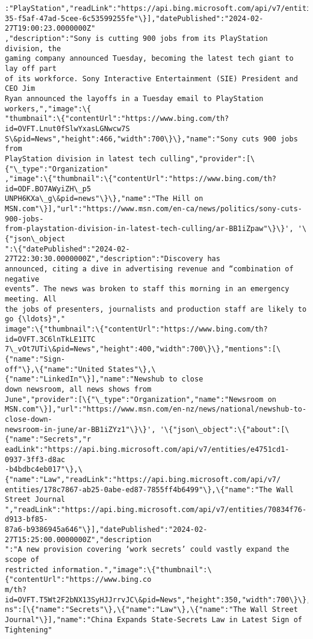\documentclass[11pt]{article}
\begin{document}
\begin{Verbatim}[commandchars=\\\{\}]
:"PlayStation","readLink":"https://api.bing.microsoft.com/api/v7/entities/2b485a
35-f5af-47ad-5cee-6c53599255fe"\}],"datePublished":"2024-02-27T19:00:23.0000000Z"
,"description":"Sony is cutting 900 jobs from its PlayStation division, the
gaming company announced Tuesday, becoming the latest tech giant to lay off part
of its workforce. Sony Interactive Entertainment (SIE) President and CEO Jim
Ryan announced the layoffs in a Tuesday email to PlayStation workers,","image":\{
"thumbnail":\{"contentUrl":"https://www.bing.com/th?id=OVFT.Lnut0fSlwYxasLGNwcw7S
S\&pid=News","height":466,"width":700\}\},"name":"Sony cuts 900 jobs from
PlayStation division in latest tech culling","provider":[\{"\_type":"Organization"
,"image":\{"thumbnail":\{"contentUrl":"https://www.bing.com/th?id=ODF.BO7AWyiZH\_p5
UNPH6KXa\_g\&pid=news"\}\},"name":"The Hill on
MSN.com"\}],"url":"https://www.msn.com/en-ca/news/politics/sony-cuts-900-jobs-
from-playstation-division-in-latest-tech-culling/ar-BB1iZpaw"\}\}', '\{"json\_object
":\{"datePublished":"2024-02-27T22:30:30.0000000Z","description":"Discovery has
announced, citing a dive in advertising revenue and “combination of negative
events”. The news was broken to staff this morning in an emergency meeting. All
the jobs of presenters, journalists and production staff are likely to go {\ldots}","
image":\{"thumbnail":\{"contentUrl":"https://www.bing.com/th?id=OVFT.3C6lnTkLE1ITC
7\_vOt7UTi\&pid=News","height":400,"width":700\}\},"mentions":[\{"name":"Sign-
off"\},\{"name":"United States"\},\{"name":"LinkedIn"\}],"name":"Newshub to close
down newsroom, all news shows from
June","provider":[\{"\_type":"Organization","name":"Newsroom on
MSN.com"\}],"url":"https://www.msn.com/en-nz/news/national/newshub-to-close-down-
newsroom-in-june/ar-BB1iZYz1"\}\}', '\{"json\_object":\{"about":[\{"name":"Secrets","r
eadLink":"https://api.bing.microsoft.com/api/v7/entities/e4751cd1-0937-3ff3-d8ac
-b4bdbc4eb017"\},\{"name":"Law","readLink":"https://api.bing.microsoft.com/api/v7/
entities/178c7867-ab25-0abe-ed87-7855ff4b6499"\},\{"name":"The Wall Street Journal
","readLink":"https://api.bing.microsoft.com/api/v7/entities/70834f76-d913-bf85-
87a6-b9386945a646"\}],"datePublished":"2024-02-27T15:25:00.0000000Z","description
":"A new provision covering ‘work secrets’ could vastly expand the scope of
restricted information.","image":\{"thumbnail":\{"contentUrl":"https://www.bing.co
m/th?id=OVFT.T5Wt2F2bNX13SyHJJrrvJC\&pid=News","height":350,"width":700\}\},"mentio
ns":[\{"name":"Secrets"\},\{"name":"Law"\},\{"name":"The Wall Street
Journal"\}],"name":"China Expands State-Secrets Law in Latest Sign of Tightening"

\end{Verbatim}
\end{document}
